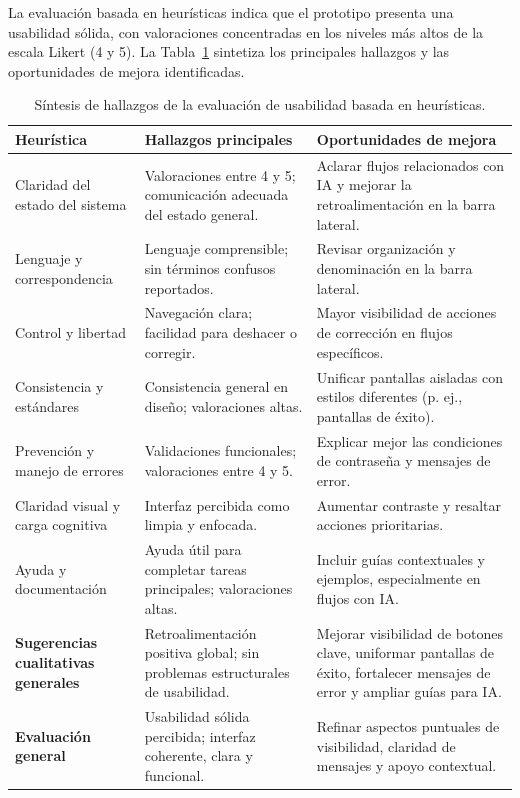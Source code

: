 La evaluación basada en heurísticas indica que el prototipo presenta una usabilidad sólida, con valoraciones concentradas en los niveles más altos de la escala Likert (4 y 5). La Tabla~\ref{tab:usabilidad-heuristicas} sintetiza los principales hallazgos y las oportunidades de mejora identificadas.

\begin{table}[H]
\centering
\footnotesize
\setlength{\tabcolsep}{5pt}
\renewcommand{\arraystretch}{1.35}
\begin{tabular}{|p{3.2cm}|p{5.4cm}|p{5.4cm}|}
\hline
\textbf{Heurística} & \textbf{Hallazgos principales} & \textbf{Oportunidades de mejora} \\
\hline

Claridad del estado del sistema
& Valoraciones entre 4 y 5; comunicación adecuada del estado general.
& Aclarar flujos relacionados con IA y mejorar la retroalimentación en la barra lateral. \\ \hline

Lenguaje y correspondencia
& Lenguaje comprensible; sin términos confusos reportados.
& Revisar organización y denominación en la barra lateral. \\ \hline

Control y libertad
& Navegación clara; facilidad para deshacer o corregir.
& Mayor visibilidad de acciones de corrección en flujos específicos. \\ \hline

Consistencia y estándares
& Consistencia general en diseño; valoraciones altas.
& Unificar pantallas aisladas con estilos diferentes (p. ej., pantallas de éxito). \\ \hline

Prevención y manejo de errores
& Validaciones funcionales; valoraciones entre 4 y 5.
& Explicar mejor las condiciones de contraseña y mensajes de error. \\ \hline

Claridad visual y carga cognitiva
& Interfaz percibida como limpia y enfocada.
& Aumentar contraste y resaltar acciones prioritarias. \\ \hline

Ayuda y documentación
& Ayuda útil para completar tareas principales; valoraciones altas.
& Incluir guías contextuales y ejemplos, especialmente en flujos con IA. \\ \hline

\textbf{Sugerencias cualitativas generales}
& Retroalimentación positiva global; sin problemas estructurales de usabilidad.
& Mejorar visibilidad de botones clave, uniformar pantallas de éxito, fortalecer mensajes de error y ampliar guías para IA. \\ \hline

\textbf{Evaluación general}
& Usabilidad sólida percibida; interfaz coherente, clara y funcional.
& Refinar aspectos puntuales de visibilidad, claridad de mensajes y apoyo contextual. \\ \hline

\end{tabular}
\caption{Síntesis de hallazgos de la evaluación de usabilidad basada en heurísticas.}
\label{tab:usabilidad-heuristicas}
\end{table}
